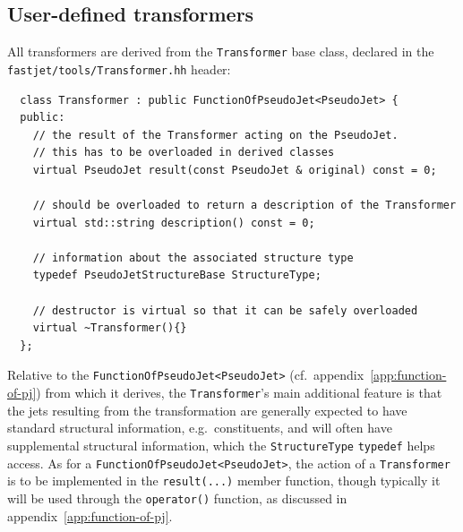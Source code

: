 \documentclass[12pt,a4]{article}
\newcommand{\ttt}[1]{{\small\texttt{#1}}}
\begin{document}
\subsection{User-defined transformers}
\label{sec:transformerdetails}



All transformers are derived from  the \ttt{Transformer} base class, 
declared in the \ttt{fastjet/tools/Transformer.hh} header:
\begin{lstlisting}
  class Transformer : public FunctionOfPseudoJet<PseudoJet> {
  public:
    // the result of the Transformer acting on the PseudoJet.
    // this has to be overloaded in derived classes
    virtual PseudoJet result(const PseudoJet & original) const = 0;
  
    // should be overloaded to return a description of the Transformer
    virtual std::string description() const = 0;
  
    // information about the associated structure type
    typedef PseudoJetStructureBase StructureType;

    // destructor is virtual so that it can be safely overloaded
    virtual ~Transformer(){}
  };
\end{lstlisting}
Relative to the \ttt{FunctionOfPseudoJet<PseudoJet>} (cf.\
appendix~\ref{app:function-of-pj}) from which it derives, the
\ttt{Transformer}'s main additional feature is that the jets resulting
from the transformation are generally expected to have standard
structural information, e.g.\ constituents, and will often have
supplemental structural information, which the \ttt{StructureType}
\ttt{typedef} helps access.
% 
As for a \ttt{FunctionOfPseudoJet<PseudoJet>}, the action of a
\ttt{Transformer} is to be implemented in the \ttt{result(...)} member
function,
%
though typically it will be used through the \ttt{operator()}
function, as discussed in appendix~\ref{app:function-of-pj}.
\end{document}
